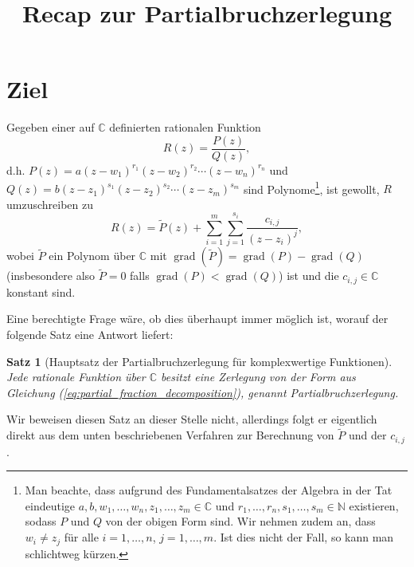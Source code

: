 \documentclass{article}
\title{Recap zur Partialbruchzerlegung}
\author{}
\date{\vspace*{-1.25cm}}
\theoremstyle{plain}
\newtheorem{theorem}{Satz}
\theoremstyle{definition}
\begin{document}
\maketitle
\section{Ziel}
Gegeben einer auf $\mathbb{C}$ definierten rationalen Funktion
\[
	R(z) = \frac{P(z)}{Q(z)},
\]
d.h. $P(z) = a (z - w_1)^{r_1} (z - w_2)^{r_2} \cdots (z - w_n)^{r_n}$ und $Q(z) = b (z - z_1)^{s_1} (z - z_2)^{s_2} \cdots (z - z_m)^{s_m}$ sind Polynome\footnote{Man beachte, dass aufgrund des Fundamentalsatzes der Algebra in der Tat eindeutige $a, b, w_1, \dots, w_n, z_1, \dots, z_m \in \mathbb{C}$ und $r_1, \dots, r_n, s_1, \dots, s_m \in \mathbb{N}$ existieren, sodass $P$ und $Q$ von der obigen Form sind. Wir nehmen zudem an, dass $w_i \neq z_j$ für alle $i = 1, \dots, n$, $j = 1, \dots, m$. Ist dies nicht der Fall, so kann man schlichtweg kürzen.}, ist gewollt, $R$ umzuschreiben zu
\begin{equation}\label{eq:partial_fraction_decomposition}
	R(z) = \tilde{P}(z) + \sum_{i=1}^{m} \sum_{j=1}^{s_i} \frac{c_{i,j}}{(z - z_i)^{j}},
\end{equation}
wobei $\tilde{P}$ ein Polynom über $\mathbb{C}$ mit $\operatorname{grad}(\tilde{P}) = \operatorname{grad}(P) - \operatorname{grad}(Q)$ (insbesondere also $\tilde{P} = 0$ falls $\operatorname{grad}(P) < \operatorname{grad}(Q)$) ist und die $c_{i, j} \in \mathbb{C}$ konstant sind.

Eine berechtigte Frage wäre, ob dies überhaupt immer möglich ist, worauf der folgende Satz eine Antwort liefert:
\begin{theorem}[Hauptsatz der Partialbruchzerlegung für komplexwertige Funktionen]
	Jede rationale Funktion über $\mathbb{C}$ besitzt eine Zerlegung von der Form aus Gleichung (\ref{eq:partial_fraction_decomposition}), genannt \emph{Partialbruchzerlegung}.
\end{theorem}
Wir beweisen diesen Satz an dieser Stelle nicht, allerdings folgt er eigentlich direkt aus dem unten beschriebenen Verfahren zur Berechnung von $\tilde{P}$ und der $c_{i, j}$.
\end{document}
